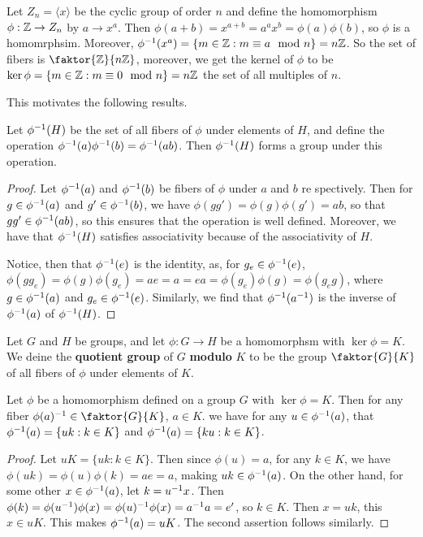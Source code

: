 \begin{example}\label{example_3.1}
  Let $Z_n=\langle x \rangle$ be the cyclic group of order $n$ and define the
  homomorphism  $\phi:\mathbb{Z} \rightarrow Z_n$ by $a \rightarrow x^a$. Then
  $\phi(a+b)=x^{a+b}=a^ax^b=\phi(a)\phi(b)$, so $\phi$ is a homomrphsim.
  Moreover,  $\phi^{-1}(x^a)=\{m \in \mathbb{Z} : m \equiv a \mod{n}\}=n\mathbb{Z}$. So the
  set of fibers is $\faktor{\Z}{n\Z}$, moreover, we get the kernel of $\phi$
  to be  $\ker{\phi}=\{m \in \mathbb{Z} : m \equiv 0 \mod{n}\}=n\mathbb{Z}$ the set of all
  multiples of $n$.
\end{example}

This motivates the following results.

\begin{theorem}\label{theorem_3.1.3}
  Let $\phi^{-1}(H)$ be the set of all fibers of $\phi$ under elements of
  $H$, and define the operation $\phi^{-1}(a)\phi^{-1}(b)=\phi^{-1}(ab)$.
  Then $\phi^{-1}(H)$ forms a group under this operation.
\end{theorem}
\begin{proof}
  Let $\phi^{-1}(a)$ and $\phi^{-1}(b)$ be fibers of  $\phi$ under  $a$ and
  $b$ re spectively. Then for $g \in \phi^{-1}(a)$ and  $g' \in
  \phi^{-1}(b)$, we have  $\phi(gg')=\phi(g)\phi(g')=ab$, so that $gg' \in
  \phi^{-1}(ab)$, so this ensures that the operation is well defined.
  Moreover, we have that $\phi^{-1}(H)$ satisfies associativity because of
  the associativity of  $H$.

  Notice, then that  $\phi^{-1}(e)$ is the identity, as, for $g_e \in
  \phi^{-1}(e)$, $\phi(gg_e)=\phi(g)\phi(g_e)=ae=a=ea=\phi(g_e)\phi(g)=
  \phi(g_eg)$, where $g \in \phi^{-1}(a)$ and $g_e \in \phi^{-1}(e)$.
  Similarly, we find that $\phi^{-1}(a^{-1})$ is the inverse of $\phi^{-1}(a)$
  of $\phi^{-1}(H)$.
\end{proof}

\begin{definition}
  Let $G$ and  $H$ be groups, and let  $\phi:G \rightarrow H$ be a homomorphsm
  with $\ker{\phi}=K$. We deine the \textbf{quotient group} of $G$
  \textbf{modulo} $K$ to be the group $\faktor{G}{K}$ of all fibers of $\phi$
  under elements of $K$.
\end{definition}

\begin{proposition}\label{proposition_3.1.4}
  Let $\phi$ be a homomorphism defined on a group  $G$ with  $\ker{\phi}=K$.
  Then for any fiber $\inv{\phi(a)} \in \faktor{G}{K}$, $a \in K$. we have
  for any $u \in \phi^{-1}(a)$, that $\phi^{-1}(a)=\{uk : k \in K\}$ and
  $\phi^{-1}(a)=\{ku : k \in K\}$.
\end{proposition}
\begin{proof}
  Let $uK=\{uk : k \in K\}$. Then since $\phi(u)=a$, for any $k \in K$, we
  have  $\phi(uk)=\phi(u)\phi(k)=ae=a$, making $uk \in \phi^{-1}(a)$. On the
  other hand, for some other $x \in \phi^{-1}(a)$, let $k=u^{-1}x$. Then
  $\phi(k)=\phi(u^{-1})\phi(x)=\phi(u)^{-1}\phi(x)=a^{-1}a=e'$, so $k \in
  K$. Then  $x=uk$, this  $x \in uK$. This makes  $\phi^{-1}(a)=uK$. The
  second assertion follows similarly.
\end{proof}

